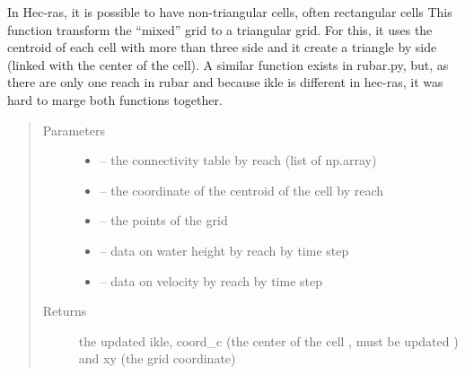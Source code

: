 \documentclass[letterpaper,10pt,english]{sphinxmanual}
\begin{document}
\begin{fulllineitems}
\label{\detokenize{index:src.hec_ras2D.get_triangular_grid_hecras}}
In Hec-ras, it is possible to have non-triangular cells, often rectangular cells This function transform the
``mixed'' grid to a triangular grid. For this,
it uses the centroid of each cell with more than three side and it create a triangle by side (linked with the
center of the cell). A similar function exists in rubar.py, but, as there are only one reach in rubar
and because ikle is different in hec-ras, it was hard to marge both functions together.
\begin{quote}\begin{description}
\item[{Parameters}] \leavevmode\begin{itemize}
\item {} 
 -- the connectivity table by reach (list of np.array)

\item {} 
 -- the coordinate of the centroid of the cell by reach

\item {} 
 -- the points of the grid

\item {} 
 -- data on water height by reach by time step

\item {} 
 -- data on velocity by reach by time step

\end{itemize}

\item[{Returns}] \leavevmode
the updated ikle, coord\_c (the center of the cell , must be updated ) and xy (the grid coordinate)

\end{description}\end{quote}

\end{fulllineitems}

\end{document}
